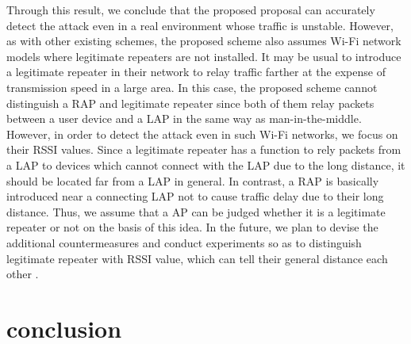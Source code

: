 \documentclass[conference]{IEEEtran}
\begin{document}
Through this result, we conclude that the proposed proposal can accurately detect the attack even in a real environment whose traffic is unstable.
However, as with other existing schemes, the proposed scheme also assumes Wi-Fi network models where legitimate repeaters are not installed.
It may be usual to introduce a legitimate repeater in their network to relay traffic farther at the expense of transmission speed in a large area.
In this case, the proposed scheme cannot distinguish a RAP and legitimate repeater since both of them relay packets between a user device and a LAP in the same way as man-in-the-middle.
However, in order to detect the attack even in such Wi-Fi networks, we focus on their RSSI values.
Since a legitimate repeater has a function to rely packets from a LAP to devices which cannot connect with the LAP due to the long distance, it should be located far from a LAP in general.
In contrast, a RAP is basically introduced near a connecting LAP not to cause traffic delay due to their long distance.
Thus, we assume that a AP can be judged whether it is a legitimate repeater or not on the basis of this idea.
In the future, we plan to devise the additional countermeasures and conduct experiments so as to distinguish legitimate repeater with RSSI value, which can tell their general distance each other \cite{rssi}.

\section{conclusion}\label{sec:6}




\vspace{12pt}
\end{document}
